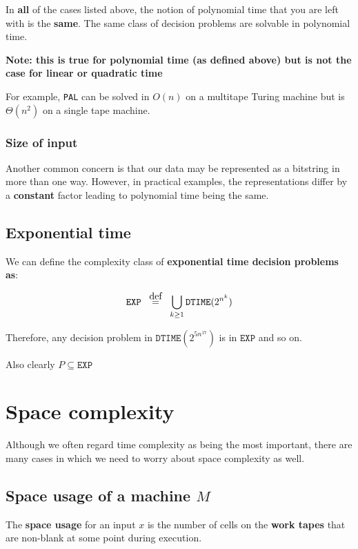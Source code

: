\documentclass{article}
\newcommand\defeq{\stackrel{\mathclap{\normalfont\mbox{def}}}{=}}
\begin{document}
In \textbf{all} of the cases listed above, the notion of polynomial time that you are left with is the \textbf{same}. The same class of decision problems are solvable in polynomial time.

\textbf{Note: this is true for polynomial time (as defined above) but is not the case for linear or quadratic time }

For example, \texttt{PAL} can be solved in $O(n)$ on a multitape Turing machine but is $\Theta(n^{2})$ on a single tape machine.

\subsubsection{Size of input}

Another common concern is that our data may be represented as a bitstring in more than one way. However, in practical examples, the representations differ by a \textbf{constant} factor leading to polynomial time being the same.

\subsection{Exponential time}

We can define the complexity class of \textbf{exponential time decision problems as}:

\[
  \texttt{EXP} \;\;\; \defeq \;\;\; \bigcup_{k\geq 1 }\texttt{DTIME} (2^{n^{k}})
\]

Therefore, any decision problem in $\texttt{DTIME} (2^{5n^{17}})$ is in $\texttt{EXP} $ and so on.

Also clearly $P \subseteq \texttt{EXP} $

\section{Space complexity}

Although we often regard time complexity as being the most important, there are many cases in which we need to worry about space complexity as well.

\subsection{Space usage of a machine $M$}

The \textbf{space usage} for an input $x$ is the number of cells on the \textbf{work tapes} that are non-blank at some point during execution.
\end{document}
